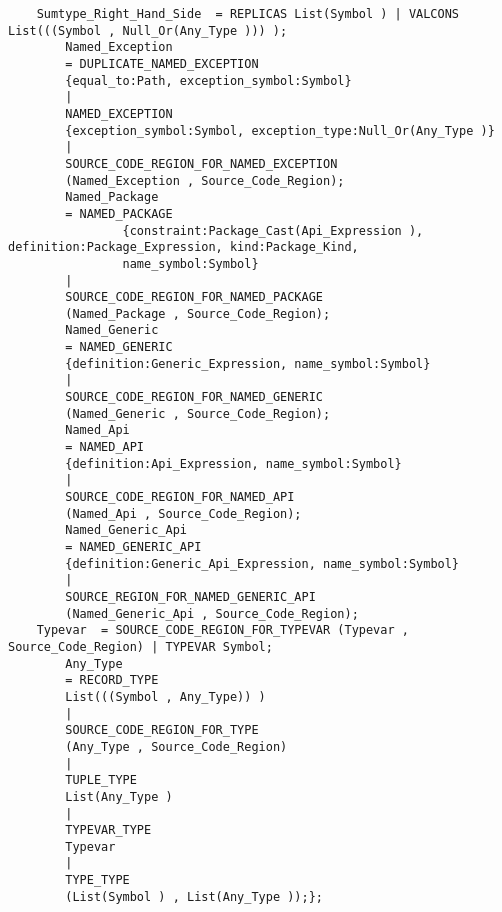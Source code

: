 \begin{verbatim}
    Sumtype_Right_Hand_Side  = REPLICAS List(Symbol ) | VALCONS List(((Symbol , Null_Or(Any_Type ))) );
        Named_Exception
        = DUPLICATE_NAMED_EXCEPTION
        {equal_to:Path, exception_symbol:Symbol}
        |
        NAMED_EXCEPTION
        {exception_symbol:Symbol, exception_type:Null_Or(Any_Type )}
        |
        SOURCE_CODE_REGION_FOR_NAMED_EXCEPTION
        (Named_Exception , Source_Code_Region);
        Named_Package
        = NAMED_PACKAGE
                {constraint:Package_Cast(Api_Expression ), definition:Package_Expression, kind:Package_Kind,
                name_symbol:Symbol}
        |
        SOURCE_CODE_REGION_FOR_NAMED_PACKAGE
        (Named_Package , Source_Code_Region);
        Named_Generic
        = NAMED_GENERIC
        {definition:Generic_Expression, name_symbol:Symbol}
        |
        SOURCE_CODE_REGION_FOR_NAMED_GENERIC
        (Named_Generic , Source_Code_Region);
        Named_Api
        = NAMED_API
        {definition:Api_Expression, name_symbol:Symbol}
        |
        SOURCE_CODE_REGION_FOR_NAMED_API
        (Named_Api , Source_Code_Region);
        Named_Generic_Api
        = NAMED_GENERIC_API
        {definition:Generic_Api_Expression, name_symbol:Symbol}
        |
        SOURCE_REGION_FOR_NAMED_GENERIC_API
        (Named_Generic_Api , Source_Code_Region);
    Typevar  = SOURCE_CODE_REGION_FOR_TYPEVAR (Typevar , Source_Code_Region) | TYPEVAR Symbol;
        Any_Type
        = RECORD_TYPE
        List(((Symbol , Any_Type)) )
        |
        SOURCE_CODE_REGION_FOR_TYPE
        (Any_Type , Source_Code_Region)
        |
        TUPLE_TYPE
        List(Any_Type )
        |
        TYPEVAR_TYPE
        Typevar
        |
        TYPE_TYPE
        (List(Symbol ) , List(Any_Type ));};
\end{verbatim}
